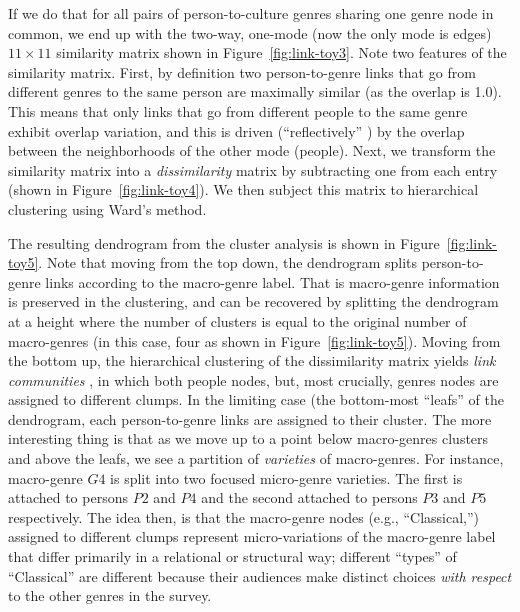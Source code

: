 \documentclass[a4paper,12pt]{extarticle}
\begin{document}
If we do that for all pairs of person-to-culture genres sharing one genre node in common, we end up with the two-way, one-mode (now the only mode is edges) $11 \times 11$ similarity matrix shown in Figure~\ref{fig:link-toy3}. Note two features of the similarity matrix. First, by definition two person-to-genre links that go from different genres to the same person are maximally similar (as the overlap is 1.0). This means that only links that go from different people to the same genre exhibit overlap variation, and this is driven (``reflectively'' \citep{lizardo18}) by the overlap between the neighborhoods of the other mode (people). Next, we transform the similarity matrix into a {\em dissimilarity} matrix by subtracting one from each entry (shown in  Figure~\ref{fig:link-toy4}). We then subject this matrix to hierarchical clustering using Ward's \citeyearpar{ward63} method. 

The resulting dendrogram from the cluster analysis is shown in Figure~\ref{fig:link-toy5}. Note that moving from the top down, the dendrogram splits person-to-genre links according to the macro-genre label. That is macro-genre information is preserved in the clustering, and can be recovered by splitting the dendrogram at a height where the number of clusters is equal to the original number of macro-genres (in this case, four as shown in Figure~\ref{fig:link-toy5}). Moving from the bottom up, the hierarchical clustering of the dissimilarity matrix yields {\em link communities} \citep{ahn_etal10}, in which both people nodes, but, most crucially, genres nodes are assigned to different clumps. In the limiting case (the bottom-most ``leafs'' of the dendrogram, each person-to-genre links are assigned to their cluster. The more interesting thing is that as we move up to a point below macro-genres clusters and above the leafs, we see a partition of {\em varieties} of macro-genres. For instance, macro-genre $G4$ is split into two focused micro-genre varieties. The first is attached to persons $P2$ and $P4$ and the second attached to persons $P3$ and $P5$ respectively. The idea then, is that the macro-genre nodes (e.g., ``Classical,'') assigned to different clumps represent micro-variations of the macro-genre label that differ primarily in a relational or structural way; different ``types'' of ``Classical'' are different because their audiences make distinct choices {\em with respect} to the other genres in the survey. 
\end{document}
